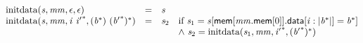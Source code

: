 $$
\begin{array}{@{}lcl@{}l@{}}
{\mathrm{initdata}}({\mathit{s}}, {\mathit{mm}}, \epsilon, \epsilon) &=& {\mathit{s}} &  \\
{\mathrm{initdata}}({\mathit{s}}, {\mathit{mm}}, {\mathit{i}}~{{\mathit{i}'}^\ast}, ({{\mathit{b}}^\ast})~{({{\mathit{b}'}^\ast})^\ast}) &=& {\mathit{s}}_{{2}} &\quad
  \mbox{if}~{\mathit{s}}_{{1}} = {\mathit{s}}[\mathsf{mem}[{\mathit{mm}}.\mathsf{mem}[0]].\mathsf{data}[{\mathit{i}} : {|{{\mathit{b}}^\ast}|}] = {{\mathit{b}}^\ast}] \\
 &&&\quad {\land}~{\mathit{s}}_{{2}} = {\mathrm{initdata}}({\mathit{s}}_{{1}}, {\mathit{mm}}, {{\mathit{i}'}^\ast}, {({{\mathit{b}'}^\ast})^\ast}) \\
\end{array}
$$

